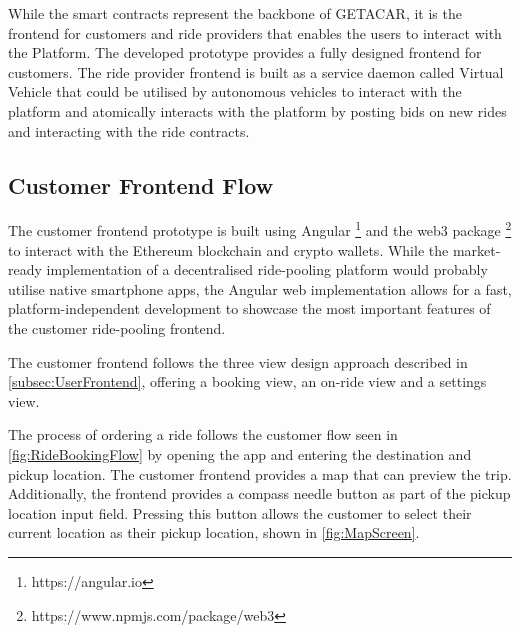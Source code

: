 While the smart contracts represent the backbone of GETACAR, it is the frontend for customers and ride providers that enables the users to interact with the Platform. The developed prototype provides a fully designed frontend  for customers. The ride provider frontend is built as a service daemon called Virtual Vehicle that could be utilised by autonomous vehicles to interact with the platform and atomically interacts with the platform by posting bids on new rides and interacting with the ride contracts. 

\subsection{Customer Frontend Flow}
The customer frontend prototype is built using Angular \footnote{https://angular.io} and the web3 package \footnote{https://www.npmjs.com/package/web3} to interact with the Ethereum blockchain and crypto wallets. While the market-ready implementation of a decentralised ride-pooling platform would probably utilise native smartphone apps, the Angular web implementation allows for a fast, platform-independent development to showcase the most important features of the customer ride-pooling frontend. 

The customer frontend follows the three view design approach described in \ref{subsec:UserFrontend}, offering a booking view, an on-ride view and a settings view. 

The process of ordering a ride follows the customer flow seen in \ref{fig:RideBookingFlow} by opening the app and entering the destination and pickup location. The customer frontend provides a map that can preview the trip. Additionally, the frontend provides  a compass needle button as part of the pickup location input field. Pressing this button allows the customer to select their current location as their pickup location, shown in \ref{fig:MapScreen}.

